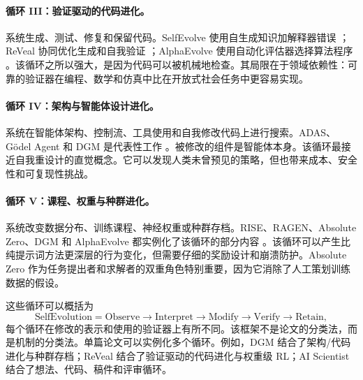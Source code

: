 \paragraph{循环 III：验证驱动的代码进化。} 系统生成、测试、修复和保留代码。SelfEvolve 使用自生成知识加解释器错误 \cite{selfevolve2023}；ReVeal 协同优化生成和自我验证 \cite{reveal2025}；AlphaEvolve 使用自动化评估器选择算法程序 \cite{alphaevolve2025}。该循环之所以强大，是因为代码可以被机械地检查。其局限在于领域依赖性：可靠的验证器在编程、数学和仿真中比在开放式社会任务中更容易实现。

\paragraph{循环 IV：架构与智能体设计进化。} 系统在智能体架构、控制流、工具使用和自我修改代码上进行搜索。ADAS、G{\"o}del Agent 和 DGM 是代表性工作 \cite{adas2025,yin2024godel,darwingodelmachine2025}。被修改的组件是智能体本身。该循环最接近自我重设计的直觉概念。它可以发现人类未曾预见的策略，但也带来成本、安全性和可复现性挑战。

\paragraph{循环 V：课程、权重与种群进化。} 系统改变数据分布、训练课程、神经权重或种群存档。RISE、RAGEN、Absolute Zero、DGM 和 AlphaEvolve 都实例化了该循环的部分内容 \cite{qu2024rise,wang2025ragen,absolutezero2025,darwingodelmachine2025,alphaevolve2025}。该循环可以产生比纯提示词方法更深层的行为变化，但需要仔细的奖励设计和崩溃防护。Absolute Zero 作为任务提出者和求解者的双重角色特别重要，因为它消除了人工策划训练数据的假设。

这些循环可以概括为
\begin{equation}
\mathrm{SelfEvolution} = \mathrm{Observe} \rightarrow \mathrm{Interpret} \rightarrow \mathrm{Modify} \rightarrow \mathrm{Verify} \rightarrow \mathrm{Retain},
\end{equation}
每个循环在修改的表示和使用的验证器上有所不同。该框架不是论文的分类法，而是机制的分类法。单篇论文可以实例化多个循环。例如，DGM 结合了架构/代码进化与种群存档；ReVeal 结合了验证驱动的代码进化与权重级 RL；AI Scientist 结合了想法、代码、稿件和评审循环。

